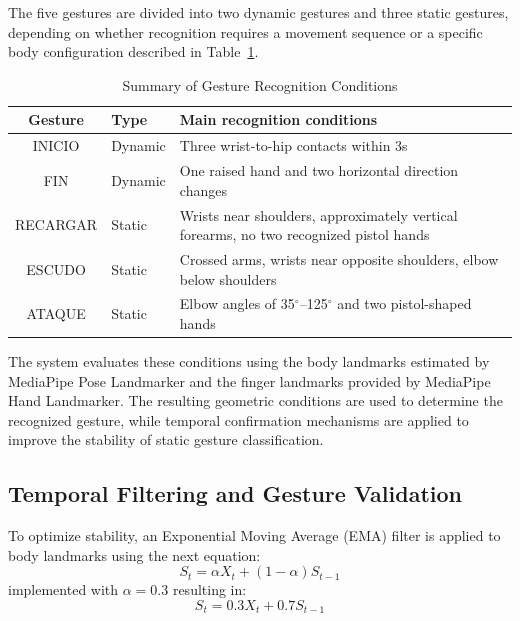 \documentclass[lettersize,journal]{IEEEtran}
\begin{document}
	The five gestures are divided into two dynamic gestures and three static gestures, depending on whether recognition requires a movement sequence or a specific body configuration described in Table~\ref{tab:gesture_conditions}.
	
	\begin{table}[!t]
		\centering
		\caption{Summary of Gesture Recognition Conditions}
		\label{tab:gesture_conditions}
		\vspace{0.5em}
		\begin{tabularx}{\columnwidth}{@{}c l X@{}}
			\toprule
			\textbf{Gesture} & \textbf{Type} & \textbf{Main recognition conditions} \\
			\midrule
			INICIO & Dynamic & Three wrist-to-hip contacts within 3s \\
			FIN & Dynamic & One raised hand and two horizontal direction changes \\
			RECARGAR & Static & Wrists near shoulders, approximately vertical forearms, no two recognized pistol hands \\
			ESCUDO & Static & Crossed arms, wrists near opposite shoulders, elbow below shoulders \\
			ATAQUE & Static & Elbow angles of 35$^\circ$--125$^\circ$ and two pistol-shaped hands \\
			\bottomrule
		\end{tabularx}
	\end{table}
	
	The system evaluates these conditions using the body landmarks estimated by MediaPipe Pose Landmarker and the finger landmarks provided by MediaPipe Hand Landmarker. The resulting geometric conditions are used to determine the recognized gesture, while temporal confirmation mechanisms are applied to improve the stability of static gesture classification.
	
	\subsection{Temporal Filtering and Gesture Validation}
	
	To optimize stability, an Exponential Moving Average (EMA) filter is applied to body landmarks using the next equation: 
	\begin{equation}
		S_t = \alpha X_t + (1 - \alpha)S_{t-1}
	\end{equation} 
	implemented with $\alpha = 0.3$ resulting in:
	\begin{equation}
		S_t = 0.3X_t + 0.7S_{t-1}
	\end{equation} 
	
\end{document}
